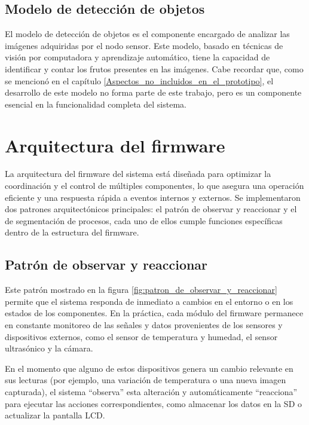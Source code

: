 \subsection{Modelo de detección de objetos}

El modelo de detección de objetos es el componente encargado de analizar las imágenes adquiridas por el nodo sensor. Este modelo, basado en técnicas de visión por computadora y aprendizaje automático, tiene la capacidad de identificar y contar los frutos presentes en las imágenes. Cabe recordar que, como se mencionó en el capítulo \ref{Aspectos_no_incluidos_en_el_prototipo}, el desarrollo de este modelo no forma parte de este trabajo, pero es un componente esencial en la funcionalidad completa del sistema. 

\newpage

\section{Arquitectura del firmware}

La arquitectura del firmware del sistema está diseñada para optimizar la coordinación y el control de múltiples componentes, lo que asegura una operación eficiente y una respuesta rápida a eventos internos y externos. Se implementaron dos patrones arquitectónicos principales: el patrón de observar y reaccionar y el de segmentación de procesos, cada uno de ellos cumple funciones específicas dentro de la estructura del firmware.

\subsection{Patrón de observar y reaccionar}

Este patrón mostrado en la figura \ref{fig:patron_de_observar_y_reaccionar} permite que el sistema responda de inmediato a cambios en el entorno o en los estados de los componentes. En la práctica, cada módulo del firmware permanece en constante monitoreo de las señales y datos provenientes de los sensores y dispositivos externos, como el sensor de temperatura y humedad, el sensor ultrasónico y la cámara. 

En el momento que alguno de estos dispositivos genera un cambio relevante en sus lecturas (por ejemplo, una variación de temperatura o una nueva imagen capturada), el sistema ``observa'' esta alteración y automáticamente ``reacciona'' para ejecutar las acciones correspondientes, como almacenar los datos en la SD o actualizar la pantalla LCD. 

